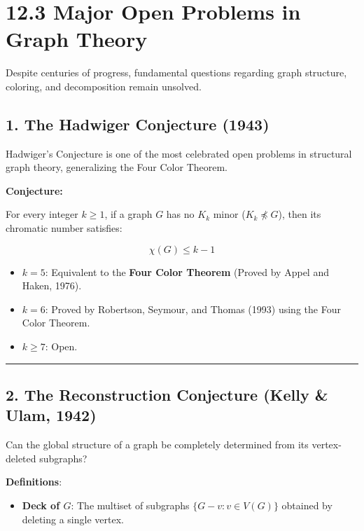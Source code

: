 \documentclass[
]{book}
\providecommand{\tightlist}{%
  \setlength{\itemsep}{0pt}\setlength{\parskip}{0pt}}
\theoremstyle{definition}
\theoremstyle{definition}
\theoremstyle{definition}
\theoremstyle{definition}
\theoremstyle{remark}
\begin{document}
\section{12.3 Major Open Problems in Graph Theory}\label{major-open-problems-in-graph-theory}

Despite centuries of progress, fundamental questions regarding graph structure, coloring, and decomposition remain unsolved.

\subsection{1. The Hadwiger Conjecture (1943)}\label{the-hadwiger-conjecture-1943}

Hadwiger's Conjecture is one of the most celebrated open problems in structural graph theory, generalizing the Four Color Theorem.

\textbf{Conjecture:}

For every integer \(k \ge 1\), if a graph \(G\) has no \(K_k\) minor (\(K_k \npreceq G\)), then its chromatic number satisfies:

\[\chi(G) \le k - 1\]

\begin{itemize}
\tightlist
\item
  \(k = 5\): Equivalent to the \textbf{Four Color Theorem} (Proved by Appel and Haken, 1976).
\item
  \(k = 6\): Proved by Robertson, Seymour, and Thomas (1993) using the Four Color Theorem.
\item
  \(k \ge 7\): Open.
\end{itemize}

\begin{center}\rule{0.5\linewidth}{0.5pt}\end{center}

\subsection{2. The Reconstruction Conjecture (Kelly \& Ulam, 1942)}\label{the-reconstruction-conjecture-kelly-ulam-1942}

Can the global structure of a graph be completely determined from its vertex-deleted subgraphs?

\textbf{Definitions}:

\begin{itemize}
\tightlist
\item
  \textbf{Deck of \(G\)}: The multiset of subgraphs \(\{G - v : v \in V(G)\}\) obtained by deleting a single vertex.
\end{itemize}
\end{document}
